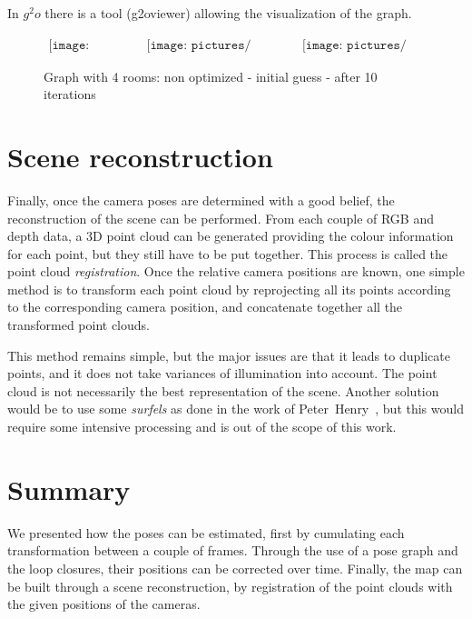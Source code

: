 In $g^2o$ there is a tool (g2oviewer) allowing the visualization of the graph.

\begin{figure}[H]
\centering$
 \begin{array}{ccc}
 \texttt{[image: pictures/graph4\_base]} &
 \texttt{[image: pictures/graph4\_initial\_guess]} &
 \texttt{[image: pictures/graph4\_optimized]}
 \end{array}$
\caption{Graph with 4 rooms: non optimized - initial guess - after 10 iterations}
\end{figure}

\section{Scene reconstruction}

Finally, once the camera poses are determined with a good belief, the reconstruction of the scene can be performed. From each couple of RGB and depth data, a 3D point cloud can be generated providing the colour information for each point, but they still have to be put together. This process is called the point cloud \emph{registration}. Once the relative camera positions are known, one simple method is to transform each point cloud by reprojecting all its points according to the corresponding camera position, and concatenate together all the transformed point clouds.

This method remains simple, but the major issues are that it leads to duplicate points, and it does not take variances of illumination into account. The point cloud is not necessarily the best representation of the scene. Another solution would be to use some \emph{surfels} as done in the work of Peter~Henry~\cite{Intel_RGBD_2010}, but this would require some intensive processing and is out of the scope of this work.

\section{Summary}

We presented how the poses can be estimated, first by cumulating each transformation between a couple of frames. Through the use of a pose graph and the loop closures, their positions can be corrected over time. Finally, the map can be built through a scene reconstruction, by registration of the point clouds with the given positions of the cameras.


